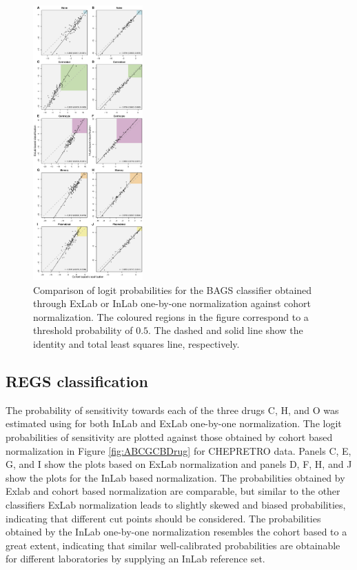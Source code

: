 \documentclass{article}
\begin{document}
\begin{figure}
\begin{center}
\includegraphics[width=0.375\textwidth]{figures/figure3.pdf}
\end{center}
\caption{
Comparison of logit probabilities for the BAGS classifier obtained through ExLab or InLab one-by-one normalization against cohort normalization.
The coloured regions in the figure correspond to a threshold probability of $0.5$.
The dashed and solid line show the identity and total least squares line, respectively.
}
\label{fig:Bagscorr}
\end{figure}
\newpage



\subsection{REGS classification}
The probability of sensitivity towards each of the three drugs C, H, and O was estimated using \hemaClass{} for both InLab and ExLab one-by-one normalization.
The logit probabilities of sensitivity are plotted against those obtained by cohort based normalization in Figure \ref{fig:ABCGCBDrug} for CHEPRETRO data.
Panels C, E, G, and I show the plots based on ExLab normalization and panels D, F, H, and J show the plots for the InLab based normalization.
The probabilities obtained by Exlab and cohort based normalization are comparable, but similar to the other classifiers ExLab normalization leads to slightly skewed and biased probabilities, indicating that different cut points should be considered.
The probabilities obtained by the InLab one-by-one normalization resembles the cohort based to a great extent, indicating that similar well-calibrated probabilities are obtainable for different laboratories by supplying an InLab reference set.
\end{document}
